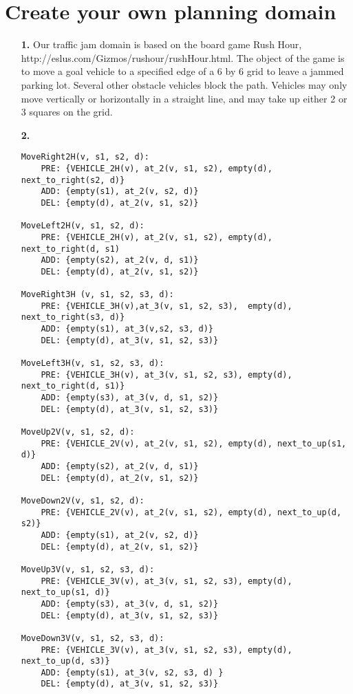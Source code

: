 \documentclass{article}
\begin{document}
\section{Create your own planning domain}
\begin{enumerate}

\item[\textbf{1.}]
Our traffic jam domain is based on the board game Rush Hour,
http://eslus.com/Gizmos/rushour/rushHour.html. The object of the game is
to move a goal vehicle to a specified edge of a 6 by 6 grid to
leave a jammed parking lot. Several other obstacle vehicles block the
path. Vehicles may only move vertically or horizontally in a straight
line, and may take up either 2 or 3 squares on the grid.

\item[\textbf{2.}]

\begin{small}
\begin{verbatim}
MoveRight2H(v, s1, s2, d):
    PRE: {VEHICLE_2H(v), at_2(v, s1, s2), empty(d), next_to_right(s2, d)}
    ADD: {empty(s1), at_2(v, s2, d)}
    DEL: {empty(d), at_2(v, s1, s2)}

MoveLeft2H(v, s1, s2, d):
    PRE: {VEHICLE_2H(v), at_2(v, s1, s2), empty(d), next_to_right(d, s1)
    ADD: {empty(s2), at_2(v, d, s1)}
    DEL: {empty(d), at_2(v, s1, s2)}

MoveRight3H (v, s1, s2, s3, d):
    PRE: {VEHICLE_3H(v),at_3(v, s1, s2, s3),  empty(d), next_to_right(s3, d)}
    ADD: {empty(s1), at_3(v,s2, s3, d)}
    DEL: {empty(d), at_3(v, s1, s2, s3)}

MoveLeft3H(v, s1, s2, s3, d):
    PRE: {VEHICLE_3H(v), at_3(v, s1, s2, s3), empty(d), next_to_right(d, s1)}
    ADD: {empty(s3), at_3(v, d, s1, s2)}
    DEL: {empty(d), at_3(v, s1, s2, s3)}

MoveUp2V(v, s1, s2, d):
    PRE: {VEHICLE_2V(v), at_2(v, s1, s2), empty(d), next_to_up(s1, d)}
    ADD: {empty(s2), at_2(v, d, s1)}
    DEL: {empty(d), at_2(v, s1, s2)}

MoveDown2V(v, s1, s2, d):
    PRE: {VEHICLE_2V(v), at_2(v, s1, s2), empty(d), next_to_up(d, s2)}
    ADD: {empty(s1), at_2(v, s2, d)}
    DEL: {empty(d), at_2(v, s1, s2)}

MoveUp3V(v, s1, s2, s3, d):
    PRE: {VEHICLE_3V(v), at_3(v, s1, s2, s3), empty(d), next_to_up(s1, d)}
    ADD: {empty(s3), at_3(v, d, s1, s2)}
    DEL: {empty(d), at_3(v, s1, s2, s3)}

MoveDown3V(v, s1, s2, s3, d):
    PRE: {VEHICLE_3V(v), at_3(v, s1, s2, s3), empty(d), next_to_up(d, s3)}
    ADD: {empty(s1), at_3(v, s2, s3, d) }
    DEL: {empty(d), at_3(v, s1, s2, s3)}
\end{verbatim}
\end{small}


\end{enumerate}
\end{document}

